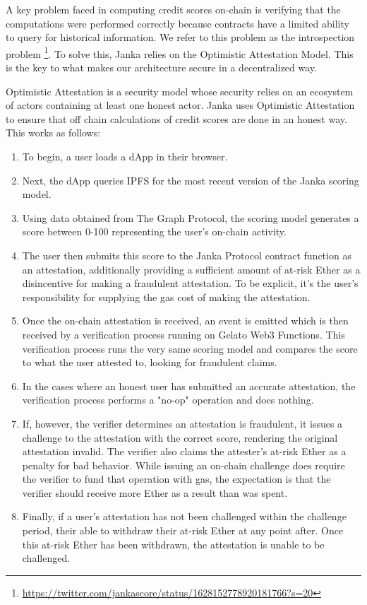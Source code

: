 \documentclass{article}
\begin{document}
A key problem faced in computing credit scores on-chain is verifying that the computations were performed correctly because contracts have a limited ability to query for historical information. We refer to this problem as the introspection problem \footnote{\url{https://twitter.com/jankascore/status/1628152778920181766?s=20}}. To solve this, Janka relies on the Optimistic Attestation Model. This is the key to what makes our architecture secure in a decentralized way.

Optimistic Attestation is a security model whose security relies on an ecosystem of actors containing at least one honest actor. Janka uses Optimistic Attestation to ensure that off chain calculations of credit scores are done in an honest way. This works as follows:

\begin{enumerate}
    \item To begin, a user loads a dApp in their browser.  
    \item Next, the dApp queries IPFS for the most recent version of the Janka scoring model.
    \item Using data obtained from The Graph Protocol, the scoring model generates a score between 0-100 representing the user's on-chain activity.
    \item The user then submits this score to the Janka Protocol contract function as an attestation, additionally providing a sufficient amount of at-risk Ether as a disincentive for making a fraudulent attestation. To be explicit, it's the user's responsibility for supplying the gas cost of making the attestation.
    \item Once the on-chain attestation is received, an event is emitted which is then received by a verification process running on Gelato Web3 Functions. This verification process runs the very same scoring model and compares the score to what the user attested to, looking for fraudulent claims.
    \item In the cases where an honest user has submitted an accurate attestation, the verification process performs a "no-op" operation and does nothing.
    \item If, however, the verifier determines an attestation is fraudulent, it issues a challenge to the attestation with the correct score, rendering the original attestation invalid. The verifier also claims the attester's at-risk Ether as a penalty for bad behavior. While issuing an on-chain challenge does require the verifier to fund that operation with gas, the expectation is that the verifier should receive more Ether as a result than was spent.
    \item Finally, if a user's attestation has not been challenged within the challenge period, their able to withdraw their at-risk Ether at any point after. Once this at-risk Ether has been withdrawn, the attestation is unable to be challenged.
\end{enumerate}
\end{document}
